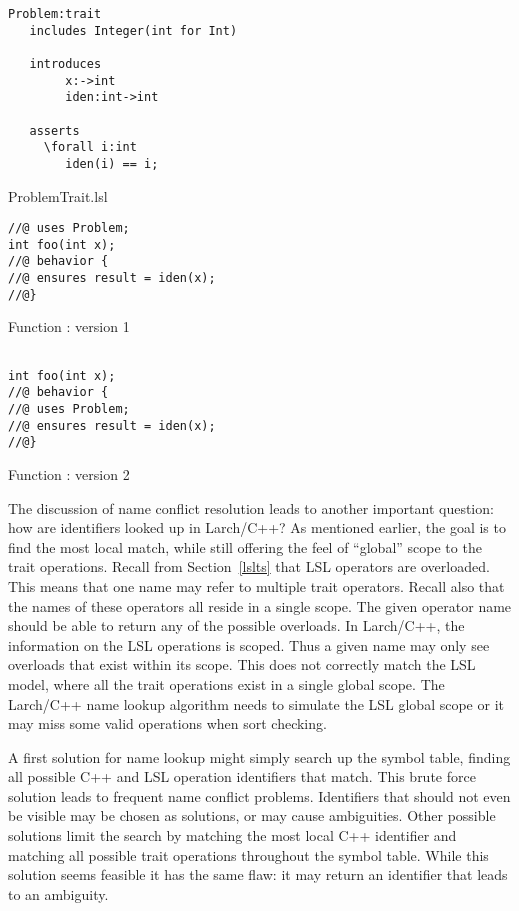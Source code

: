 \begin{BFIGURE}
\begin{verbatim}
Problem:trait
   includes Integer(int for Int)

   introduces
        x:->int
        iden:int->int

   asserts
     \forall i:int
        iden(i) == i;
\end{verbatim}
\caption{ProblemTrait.lsl}
\label{Problemtrait}
\end{BFIGURE}

\begin{BFIGURE}
\begin{verbatim}
//@ uses Problem;
int foo(int x);
//@ behavior {
//@ ensures result = iden(x);
//@}
\end{verbatim}
\caption{Function : version 1}
\label{fooex}
\end{BFIGURE}


\begin{BFIGURE}
\begin{verbatim}

int foo(int x);
//@ behavior {
//@ uses Problem;
//@ ensures result = iden(x);
//@}
\end{verbatim}
\caption{Function : version 2}
\label{fooex2}
\end{BFIGURE}

The discussion of name conflict resolution leads to another
important question: how are identifiers looked up in Larch/C++? As
mentioned earlier, the goal is to find the most local match, while
still offering the feel of ``global'' scope to the trait
operations. Recall from Section~\ref{lslts} that LSL operators are
overloaded. This means that one name may refer to multiple trait
operators. Recall also that the names of these operators all reside
in a single scope. The given operator name should be able to return
any of the possible overloads. In Larch/C++, the information on the
LSL operations is scoped. Thus a given name may only see overloads that
exist within its scope. This does not correctly match the LSL model, where
all the trait operations exist in a single global scope. The Larch/C++ name
lookup algorithm needs to simulate the LSL global scope or it may miss some
valid operations when sort checking. 

A first solution for name lookup might simply search up the symbol
table, finding all possible C++ and LSL operation identifiers that
match. This brute force solution leads to frequent name
conflict problems. Identifiers that should not even
be visible may be chosen as solutions, or may cause ambiguities. Other
possible solutions limit the search by matching the most local C++
identifier and matching all possible trait operations throughout the
symbol table. While this solution seems feasible it has the same flaw:
it may return an identifier that leads to an ambiguity.


